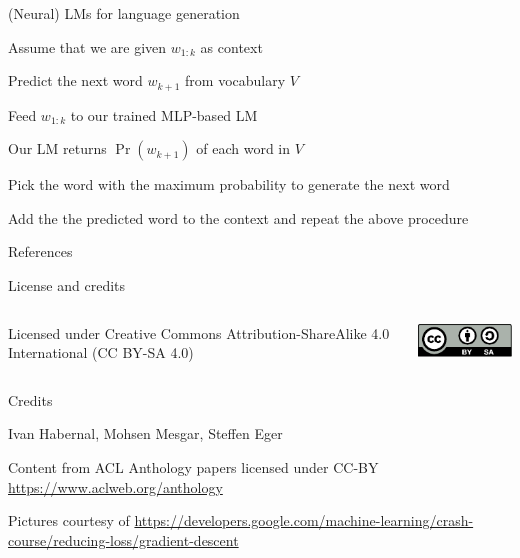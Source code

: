 \documentclass[12pt]{beamer}
\begin{document}
\begin{frame}{(Neural) LMs for language generation}
	
Assume that we are given $w_{1:k}$ as context

Predict the next word $w_{k+1}$ from vocabulary $V$

Feed $w_{1:k}$ to our trained MLP-based LM 

Our LM returns $\Pr(w_{k+1})$ of each word in $V$ 

Pick the word with the maximum probability to generate the next word

Add the the predicted word to the context and repeat the above procedure
	
\end{frame}


\begin{frame}[allowframebreaks]{References}
\printbibliography
%  
%  
\end{frame}

\begin{frame}{License and credits}
	
	\begin{columns}
		\begin{column}{0.7\textwidth}
			Licensed under Creative Commons Attribution-ShareAlike 4.0 International (CC BY-SA 4.0)
		\end{column}
		\begin{column}{0.2\textwidth}
			\includegraphics[width=0.9\linewidth]{img/cc-by-sa-icon.pdf}
		\end{column}
	\end{columns}
	
	\bigskip
	
	Credits
	
	\begin{scriptsize}
		
		Ivan Habernal, Mohsen Mesgar, Steffen Eger
		
		Content from ACL Anthology papers licensed under CC-BY \url{https://www.aclweb.org/anthology}
		
		Pictures courtesy of 	\url{https://developers.google.com/machine-learning/crash-course/reducing-loss/gradient-descent}
		
	\end{scriptsize}
	
\end{frame}
\end{document}
